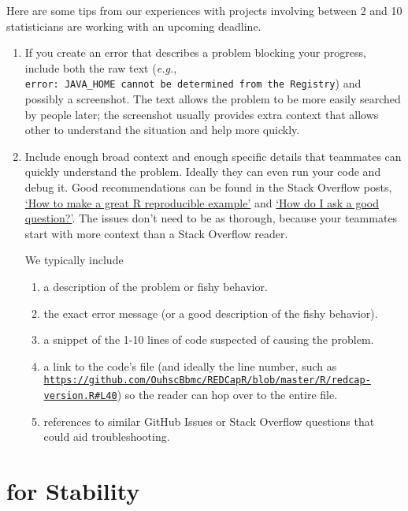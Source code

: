\documentclass[
]{book}
\begin{document}
Here are some tips from our experiences with projects involving between 2 and 10 statisticians are working with an upcoming deadline.

\begin{enumerate}
\def\labelenumi{\arabic{enumi}.}
\item
  If you create an error that describes a problem blocking your progress, include both the raw text (\emph{e.g.}, \texttt{error:\ JAVA\_HOME\ cannot\ be\ determined\ from\ the\ Registry}) and possibly a screenshot. The text allows the problem to be more easily searched by people later; the screenshot usually provides extra context that allows other to understand the situation and help more quickly.
\item
  Include enough broad context and enough specific details that teammates can quickly understand the problem. Ideally they can even run your code and debug it. Good recommendations can be found in the Stack Overflow posts, \href{https://stackoverflow.com/questions/5963269/how-to-make-a-great-r-reproducible-example?rq=1}{`How to make a great R reproducible example'} and \href{https://stackoverflow.com/help/how-to-ask}{`How do I ask a good question?'}. The issues don't need to be as thorough, because your teammates start with more context than a Stack Overflow reader.

  We typically include

  \begin{enumerate}
  \def\labelenumii{\arabic{enumii}.}
  \item
    a description of the problem or fishy behavior.
  \item
    the exact error message (or a good description of the fishy behavior).
  \item
    a snippet of the 1-10 lines of code suspected of causing the problem.
  \item
    a link to the code's file (and ideally the line number, such as \href{https://github.com/OuhscBbmc/REDCapR/blob/master/R/redcap-version.R\#L40}{\texttt{https://github.com/OuhscBbmc/REDCapR/blob/master/R/redcap-version.R\#L40}}) so the reader can hop over to the entire file.
  \item
    references to similar GitHub Issues or Stack Overflow questions that could aid troubleshooting.
  \end{enumerate}
\end{enumerate}

\hypertarget{for-stability}{%
\section{for Stability}\label{for-stability}}
\end{document}
